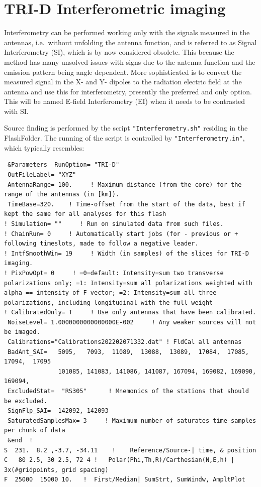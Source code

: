 \section{TRI-D Interferometric imaging}

Interferometry can be performed working only with the signals measured in the antennas, i.e.\ without unfolding the antenna function, and is referred to as Signal Interferometry (SI), which is by now considered obsolete. This because the method has many unsolved issues with signs due to the antenna function and the emission pattern being angle dependent. More sophisticated is to convert the measured signal in the X- and Y- dipoles to the radiation electric field at the antenna and use this for interferometry, presently the preferred and only option. This will be named E-field Interferometry (EI) when it needs to be contrasted with SI.

Source finding is performed by the script \verb!"Interferometry.sh"! residing in the FlashFolder. The running of the script is controlled by \verb!"Interferometry.in"!, which typically resembles:

\begin{linenumbers}
\resetlinenumber
\tiny
\begin{verbatim}
 &Parameters  RunOption= "TRI-D"
 OutFileLabel= "XYZ"
 AntennaRange= 100.     ! Maximum distance (from the core) for the range of the antennas (in [km]).
 TimeBase=320.    ! Time-offset from the start of the data, best if kept the same for all analyses for this flash
! Simulation= ""     ! Run on simulated data from such files.
! ChainRun= 0     ! Automatically start jobs (for - previous or + following timeslots, made to follow a negative leader.
! IntfSmoothWin= 19     ! Width (in samples) of the slices for TRI-D imaging.
! PixPowOpt= 0     ! =0=default: Intensity=sum two transverse polarizations only; =1: Intensity=sum all polarizations weighted with alpha == intensity of F vector; =2: Intensity=sum all three polarizations, including longitudinal with the full weight
! CalibratedOnly= T     ! Use only antennas that have been calibrated.
 NoiseLevel= 1.0000000000000000E-002     ! Any weaker sources will not be imaged.
 Calibrations="Calibrations202202071332.dat" ! FldCal all antennas
 BadAnt_SAI=   5095,   7093,  11089,  13088,  13089,  17084,  17085,  17094,  17095
               101085, 141083, 141086, 141087, 167094, 169082, 169090, 169094,
 ExcludedStat=  "RS305"      ! Mnemonics of the stations that should be excluded.
 SignFlp_SAI=  142092, 142093
 SaturatedSamplesMax= 3     ! Maximum number of saturates time-samples per chunk of data
 &end  !
S  231.  8.2 ,-3.7, -34.11    !    Reference/Source-| time, & position
C   80 2.5, 30 2.5, 72 4 !   Polar(Phi,Th,R)/Carthesian(N,E,h) | 3x(#gridpoints, grid spacing)
F  25000  15000 10.   !  First/Median| SumStrt, SumWindw, AmpltPlot
\end{verbatim}
\end{linenumbers}

